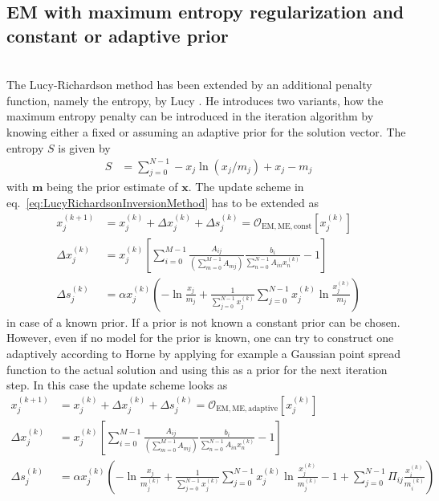 \subsection{EM with maximum entropy regularization and constant or adaptive prior}~\\
The Lucy\hyp{}Richardson method \cite{Richardson1972,Lucy1974} has been extended by an additional penalty function,
namely the entropy, by Lucy \cite{Lucy1994}. He introduces two variants, how the maximum entropy penalty can be introduced in the iteration algorithm by knowing either a fixed or assuming an adaptive prior for the solution vector. The entropy $S$ is given by
\begin{align}
S&= \sum_{j=0}^{N-1} -x_j\ln\left(x_j/m_j\right) +x_j-m_j \label{eq:EMentropy}
\end{align}
with $\mathbf{m}$ being the prior estimate of $\mathbf{x}$. The update scheme in eq.\ \ref{eq:LucyRichardsonInversionMethod} has to be extended as
\begin{align}
\label{eq:LucyRichardsonInversionMethodMEconstant}
  x_j^{(k+1)} &= x_j^{(k)} + \Delta x_j^{(k)} + \Delta s_j^{(k)}= \mathcal{O}_\mathrm{EM,ME,const}\left[x_j^{(k)}\right]\\
  \Delta x_j^{(k)} &= x_j^{(k)}\left[\sum_{i=0}^{M-1}\frac{A_{ij}}{\left(\displaystyle \sum_{m=0}^{M-1}A_{mj}\right)}\frac{b_i}{\displaystyle \sum_{n=0}^{N-1}A_{in}x_n^{(k)}}-1\right] \\
  \Delta s_j^{(k)} &=  \alpha x_j^{(k)}\left(-\ln\frac{x_j}{m_j}+\frac{1}{\sum_{j=0}^{N-1}x_j^{(k)}}\sum_{j=0}^{N-1}x_j^{(k)}\ln\frac{x_j^{(k)}}{m_j}\right)
\end{align}
in case of a known prior. If a prior is not known a constant prior can be chosen. However, even if no model for the prior is known, one can try to construct one adaptively according to Horne \cite{Horne1985} by applying for example a Gaussian point spread function to the actual solution and using this as a prior for the next iteration step. In this case the update scheme looks as
\begin{align}
\label{eq:LucyRichardsonInversionMethodMEadaptive}
  x_j^{(k+1)} &= x_j^{(k)} + \Delta x_j^{(k)} + \Delta s_j^{(k)}= \mathcal{O}_\mathrm{EM,ME,adaptive}\left[x_j^{(k)}\right]\\
  \Delta x_j^{(k)} &= x_j^{(k)}\left[\sum_{i=0}^{M-1}\frac{A_{ij}}{\left(\displaystyle \sum_{m=0}^{M-1}A_{mj}\right)}\frac{b_i}{\displaystyle \sum_{n=0}^{N-1}A_{in}x_n^{(k)}}-1\right] \\
  \Delta s_j^{(k)} &=  \alpha x_j^{(k)}\left(-\ln\frac{x_j}{m_j^{(k)}}
                                +\frac{1}{\sum_{j=0}^{N-1}x_j^{(k)}}\sum_{j=0}^{N-1}x_j^{(k)}\ln\frac{x_j^{(k)}}{m_j^{(k)}}
                                -1+\sum_{j=0}^{N-1}\Pi_{ij}\frac{x_i^{(k)}}{m_i^{(k)}}\right)
\end{align}
